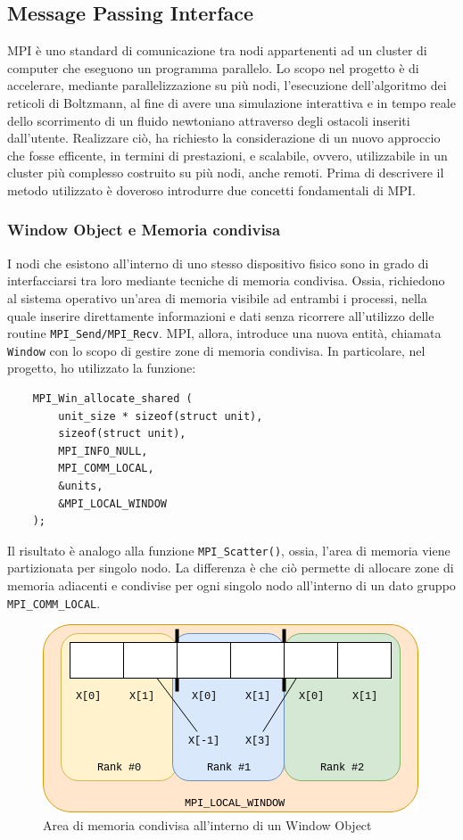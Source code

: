 \documentclass[12pt]{article}
\begin{document}
\subsection{Message Passing Interface}

MPI è uno standard di comunicazione tra nodi appartenenti ad un cluster di computer che eseguono un programma parallelo.
Lo scopo nel progetto è di accelerare, mediante parallelizzazione su più nodi, l'esecuzione dell'algoritmo dei reticoli di Boltzmann, al fine di avere una simulazione interattiva e in tempo reale dello scorrimento di un fluido newtoniano attraverso degli ostacoli inseriti dall'utente.
Realizzare ciò, ha richiesto la considerazione di un nuovo approccio che fosse efficente, in termini di prestazioni, e scalabile, ovvero, utilizzabile in un cluster più complesso costruito su più nodi, anche remoti.
Prima di descrivere il metodo utilizzato è doveroso introdurre due concetti fondamentali di MPI.


\subsubsection{Window Object e Memoria condivisa}
\label{sec:mpi1}
I nodi che esistono all'interno di uno stesso dispositivo fisico sono in grado di interfacciarsi tra loro mediante tecniche di memoria condivisa. Ossia, richiedono al sistema operativo un'area di memoria visibile ad entrambi i processi, nella quale inserire direttamente informazioni e dati senza ricorrere all'utilizzo delle routine \verb|MPI_Send/MPI_Recv|.
MPI, allora, introduce una nuova entità, chiamata \verb|Window| con lo scopo di gestire zone di memoria condivisa.
In particolare, nel progetto, ho utilizzato la funzione:

\begin{lstlisting}
    MPI_Win_allocate_shared (
        unit_size * sizeof(struct unit), 
        sizeof(struct unit), 
        MPI_INFO_NULL, 
        MPI_COMM_LOCAL, 
        &units, 
        &MPI_LOCAL_WINDOW
    );
\end{lstlisting}

Il risultato è analogo alla funzione \verb|MPI_Scatter()|, ossia, l'area di memoria viene partizionata per singolo nodo.
La differenza è che ciò permette di allocare zone di memoria adiacenti e condivise per ogni singolo nodo all'interno di un dato gruppo \verb|MPI_COMM_LOCAL|.

\begin{figure}
    \centering
    \includegraphics[scale=0.75]{3}
    \caption{Area di memoria condivisa all'interno di un Window Object}
    \label{fig:winobj}
\end{figure}
\end{document}
